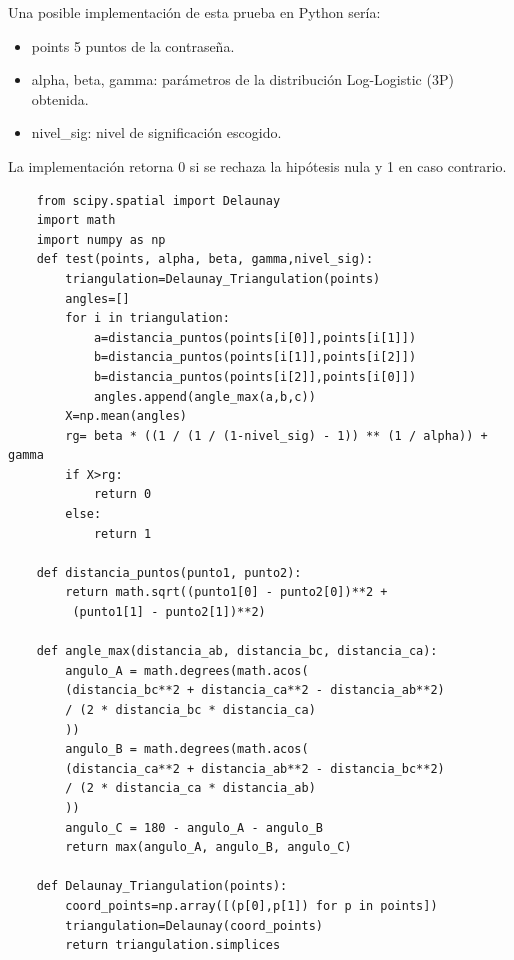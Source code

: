 \documentclass[12pt]{report}
\begin{document}
Una posible implementación de esta prueba en Python sería:




\begin{itemize}
	\item points 5 puntos de la contraseña.
	\item alpha, beta, gamma: parámetros de la distribución Log-Logistic (3P) obtenida.
	\item nivel\_sig: nivel de significación escogido.
	
\end{itemize}
La implementación retorna 0 si se rechaza la hipótesis nula y 1 en caso contrario. 





\begin{lstlisting}
	from scipy.spatial import Delaunay
	import math
	import numpy as np
	def test(points, alpha, beta, gamma,nivel_sig):
		triangulation=Delaunay_Triangulation(points)
		angles=[]
		for i in triangulation:
			a=distancia_puntos(points[i[0]],points[i[1]])
			b=distancia_puntos(points[i[1]],points[i[2]])
			b=distancia_puntos(points[i[2]],points[i[0]])
			angles.append(angle_max(a,b,c))     
		X=np.mean(angles) 
		rg= beta * ((1 / (1 / (1-nivel_sig) - 1)) ** (1 / alpha)) + gamma
		if X>rg:
			return 0
		else:
			return 1
	
	def distancia_puntos(punto1, punto2):
		return math.sqrt((punto1[0] - punto2[0])**2 +
		 (punto1[1] - punto2[1])**2)
	
	def angle_max(distancia_ab, distancia_bc, distancia_ca):
		angulo_A = math.degrees(math.acos(
		(distancia_bc**2 + distancia_ca**2 - distancia_ab**2) 
		/ (2 * distancia_bc * distancia_ca)
		))
		angulo_B = math.degrees(math.acos(
		(distancia_ca**2 + distancia_ab**2 - distancia_bc**2) 
		/ (2 * distancia_ca * distancia_ab)
		))
		angulo_C = 180 - angulo_A - angulo_B  
		return max(angulo_A, angulo_B, angulo_C)
		
	def Delaunay_Triangulation(points):
		coord_points=np.array([(p[0],p[1]) for p in points])
		triangulation=Delaunay(coord_points)
		return triangulation.simplices	
\end{lstlisting}
\end{document}
